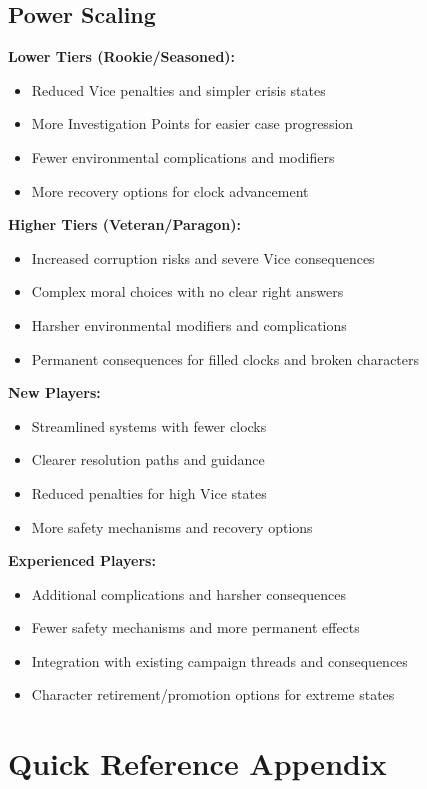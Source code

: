 \documentclass[11pt]{article}
\begin{document}
\subsection{Power Scaling}

\textbf{Lower Tiers (Rookie/Seasoned):}
\begin{itemize}
\item Reduced Vice penalties and simpler crisis states
\item More Investigation Points for easier case progression
\item Fewer environmental complications and modifiers
\item More recovery options for clock advancement
\end{itemize}

\textbf{Higher Tiers (Veteran/Paragon):}
\begin{itemize}
\item Increased corruption risks and severe Vice consequences
\item Complex moral choices with no clear right answers
\item Harsher environmental modifiers and complications
\item Permanent consequences for filled clocks and broken characters
\end{itemize}

\textbf{New Players:}
\begin{itemize}
\item Streamlined systems with fewer clocks
\item Clearer resolution paths and guidance
\item Reduced penalties for high Vice states
\item More safety mechanisms and recovery options
\end{itemize}

\textbf{Experienced Players:}
\begin{itemize}
\item Additional complications and harsher consequences
\item Fewer safety mechanisms and more permanent effects
\item Integration with existing campaign threads and consequences
\item Character retirement/promotion options for extreme states
\end{itemize}

\section{Quick Reference Appendix}
\end{document}
